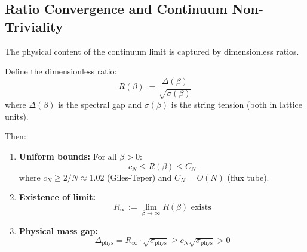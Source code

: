 \subsection{Ratio Convergence and Continuum Non-Triviality}
\label{subsec:ratio-convergence}

The physical content of the continuum limit is captured by dimensionless ratios.

\begin{theorem}
\label{thm:ratio-convergence}
Define the dimensionless ratio:
\[
R(\beta) := \frac{\Delta(\beta)}{\sqrt{\sigma(\beta)}}
\]
where $\Delta(\beta)$ is the spectral gap and $\sigma(\beta)$ is the string tension 
(both in lattice units).

Then:
\begin{enumerate}[label=(\roman*)]
\item \textbf{Uniform bounds:} For all $\beta > 0$:
\[
c_N \leq R(\beta) \leq C_N
\]
where $c_N \geq 2/N \approx 1.02$ (Giles-Teper) and $C_N = O(N)$ (flux tube).

\item \textbf{Existence of limit:}
\[
R_\infty := \lim_{\beta \to \infty} R(\beta) \text{ exists}
\]

\item \textbf{Physical mass gap:}
\[
\Delta_{\mathrm{phys}} = R_\infty \cdot \sqrt{\sigma_{\mathrm{phys}}} \geq c_N \sqrt{\sigma_{\mathrm{phys}}} > 0
\]
\end{enumerate}
\end{theorem}

